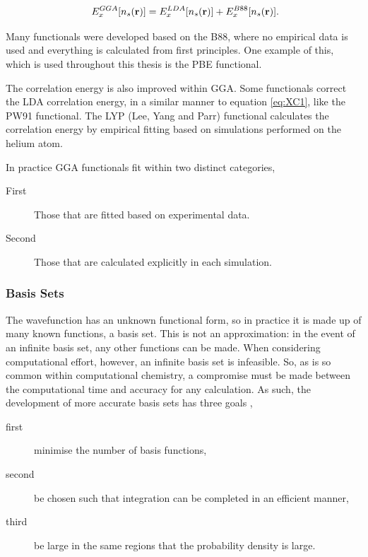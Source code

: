 \begin{equation} \label{eq:XC1}
\ E^{GGA}_{x}[n_s(\mathbf{r})] = E^{LDA}_{x}[n_s(\mathbf{r})] + E^{B88}_{x}[n_s(\mathbf{r})] \\.
\end{equation}

Many functionals were developed based on the B88, where no empirical data is used and everything is calculated from first principles.  One example of this, which is used throughout this thesis is the PBE functional\cite{GGA_made_simple}.

The correlation energy is also improved within GGA.  Some functionals correct the LDA correlation energy, in a similar manner to equation \ref{eq:XC1}, like the PW91 functional\cite{PW91}.  The LYP (Lee, Yang and Parr) functional\cite{LYP} calculates the correlation energy by empirical fitting based on simulations performed on the helium atom.

In practice GGA functionals fit within two distinct categories,

\begin{description}
  \item[First] Those that are fitted based on experimental data.
  \item[Second] Those that are calculated explicitly in each simulation.
\end{description}

\subsubsection{Basis Sets}

The wavefunction has an unknown functional form, so in practice it is made up of many known functions, a basis set.  This is not an approximation: in the event of an infinite basis set, any other functions can be made.  When considering computational effort, however, an infinite basis set is infeasible.  So, as is so common within computational chemistry, a compromise must be made between the computational time and accuracy for any calculation.  As such, the development of more accurate basis sets has three goals \cite{cramer_chem},

\begin{description}
  \item[first] minimise the number of basis functions,
  \item[second] be chosen such that integration can be completed in an efficient manner,
  \item[third] be large in the same regions that the probability density is large.
\end{description}

